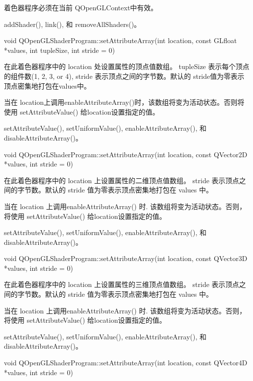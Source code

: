 着色器程序必须在当前 QOpenGLContext中有效。

\begin{seeAlso}
addShader(), link(), 和 removeAllShaders()。
\end{seeAlso}

void QOpenGLShaderProgram::setAttributeArray(int location, const GLfloat *values, int tupleSize, int stride = 0)

在此着色器程序中的 location 处设置属性的顶点值数组。 tupleSize 表示每个顶点的组件数(1, 2, 3, or 4), stride 表示顶点之间的字节数。默认的 stride值为零表示顶点密集地打包在values中。

当在 location上调用enableAttributeArray()时，该数组将变为活动状态。否则将使用 setAttributeValue() 给location设置指定的值。


\begin{seeAlso}
setAttributeValue(), setUniformValue(), enableAttributeArray(), 和 disableAttributeArray()。
\end{seeAlso}

void QOpenGLShaderProgram::setAttributeArray(int location, const QVector2D *values, int stride = 0)

在此着色器程序中的 location 上设置属性的二维顶点值数组。 stride 表示顶点之间的字节数。默认的 stride 值为零表示顶点密集地打包在 values 中。

当在 location 上调用enableAttributeArray() 时. 该数组将变为活动状态。否则，将使用 setAttributeValue() 给location设置指定的值。

\begin{seeAlso}
setAttributeValue(), setUniformValue(), enableAttributeArray(), 和 disableAttributeArray()。
\end{seeAlso}

void QOpenGLShaderProgram::setAttributeArray(int location, const QVector3D *values, int stride = 0)

在此着色器程序中的 location 上设置属性的三维顶点值数组。 stride 表示顶点之间的字节数。默认的 stride 值为零表示顶点密集地打包在 values 中。

当在 location 上调用enableAttributeArray() 时. 该数组将变为活动状态。否则，将使用 setAttributeValue() 给location设置指定的值。


\begin{seeAlso}
setAttributeValue(), setUniformValue(), enableAttributeArray(), 和 disableAttributeArray()。
\end{seeAlso}

void QOpenGLShaderProgram::setAttributeArray(int location, const QVector4D *values, int stride = 0)

